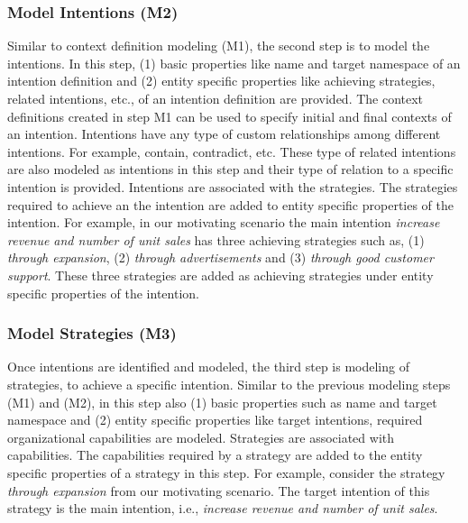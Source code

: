 \subsubsection{Model Intentions (M2)}  
Similar to context definition modeling (M1), the second step is to model the intentions. In this step, (1) basic properties like name and target namespace of an intention definition and (2) entity specific properties like achieving strategies, related intentions, etc., of an intention definition are provided. The context definitions created in step M1 can be used to specify initial and final contexts of an intention. Intentions have any type of custom relationships among different intentions. For example, contain, contradict, etc. These type of related intentions are also modeled as intentions in this step and their type of relation to a specific intention is provided. Intentions are associated with the strategies. The strategies required to achieve an the intention are added to entity specific properties of the intention. For example, in our motivating scenario the main intention \textit{increase revenue and number of unit sales} has three achieving strategies such as, (1) \textit{through expansion}, (2) \textit{through advertisements} and (3) \textit{through good customer support}. These three strategies are added as achieving strategies under entity specific properties of the intention.

\subsubsection{Model Strategies (M3)}  
Once intentions are identified and modeled, the third step is modeling of strategies, to achieve a specific intention. Similar to the previous modeling steps (M1) and (M2), in this step also (1) basic properties such as name and target namespace and (2) entity specific properties like target intentions, required organizational capabilities are modeled. Strategies are associated with capabilities. The capabilities required by a strategy are added to the entity specific properties of a strategy in this step. For example, consider the strategy \textit{through expansion} from our motivating scenario. The target intention of this strategy is the main intention, i.e., \textit{increase revenue and number of unit sales}.  

